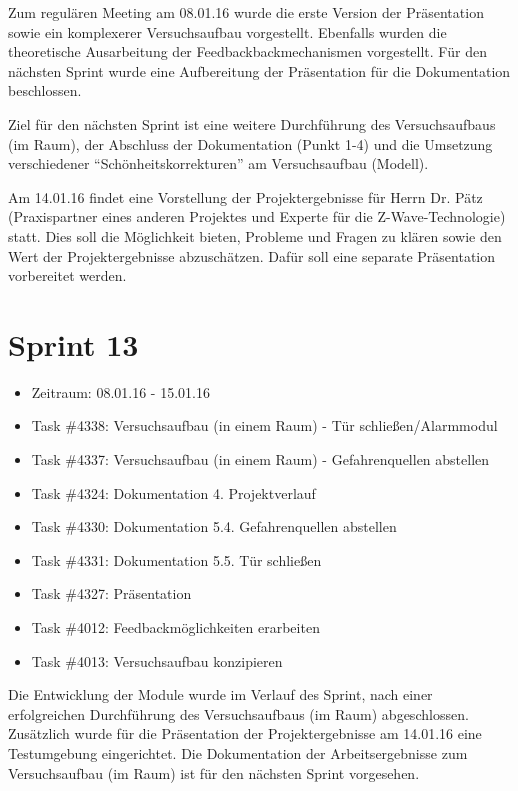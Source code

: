 \documentclass[12pt, oneside, smallheadings]{scrbook}
\begin{document}
Zum regulären Meeting am 08.01.16 wurde die erste Version der Präsentation sowie ein komplexerer Versuchsaufbau vorgestellt. Ebenfalls wurden die theoretische Ausarbeitung der Feedbackbackmechanismen vorgestellt. Für den nächsten Sprint wurde eine Aufbereitung der Präsentation für die Dokumentation beschlossen.

Ziel für den nächsten Sprint ist eine weitere Durchführung des Versuchsaufbaus (im Raum), der Abschluss der Dokumentation (Punkt 1-4) und die Umsetzung verschiedener "`Schönheitskorrekturen"' am Versuchsaufbau (Modell). 

Am 14.01.16 findet eine Vorstellung der Projektergebnisse für Herrn Dr. Pätz (Praxispartner eines anderen Projektes und Experte für die Z-Wave-Technologie) statt. Dies soll die Möglichkeit bieten, Probleme und Fragen zu klären sowie den Wert der Projektergebnisse abzuschätzen. Dafür soll eine separate Präsentation vorbereitet werden.

\section{Sprint 13}
\begin{itemize}
	\item Zeitraum: 08.01.16 - 15.01.16 \newline
	\item Task \#4338: Versuchsaufbau (in einem Raum) - Tür schließen/Alarmmodul
	\item Task \#4337: Versuchsaufbau (in einem Raum) - Gefahrenquellen abstellen
	\item Task \#4324: Dokumentation 4. Projektverlauf
	\item Task \#4330: Dokumentation 5.4. Gefahrenquellen abstellen
	\item Task \#4331: Dokumentation 5.5. Tür schließen
	\item Task \#4327: Präsentation
	\item Task \#4012: Feedbackmöglichkeiten erarbeiten
	\item Task \#4013: Versuchsaufbau konzipieren\\
\end{itemize}
\noindent
Die Entwicklung der Module wurde im Verlauf des Sprint, nach einer erfolgreichen Durchführung des Versuchsaufbaus (im Raum) abgeschlossen. Zusätzlich wurde für die Präsentation der Projektergebnisse am 14.01.16 eine Testumgebung eingerichtet. Die Dokumentation der Arbeitsergebnisse zum Versuchsaufbau (im Raum) ist für den nächsten Sprint vorgesehen.
\end{document}
